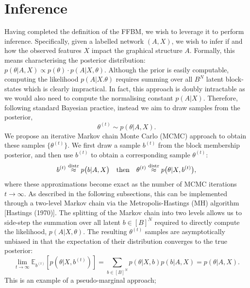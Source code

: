 \section{Inference}
\label{sec:inference}

Having completed the definition of the FFBM, we wish to leverage it 
to perform inference. Specifically, given a labelled network $(A, X)$, we wish to infer if and how the observed features $X$ impact the graphical structure $A$. Formally,
this means characterising the posterior distribution:
$
p(\theta|A, X) \propto p(\theta) \cdot p(A | X, \theta).
$
Although the prior is easily computable, 
computing the likelihood $p(A| X. \theta)$
requires summing over all $B^N$ latent block-states which is 
clearly impractical. In fact, this
approach is doubly intractable as we would also 
need to compute the normalising constant $p(A|X)$.
Therefore, following standard Bayesian practice,
instead we aim to draw samples from the posterior,
%
\begin{equation}
	\label{eqn:theta-target}
	\theta^{(t)} \sim p(\theta | A, X).
\end{equation}
%
We propose an iterative Markov chain Monte Carlo
(MCMC) approach to obtain these samples
$\{\theta^{(t)}\}$. We first draw a sample $b^{(t)}$ 
from the block membership posterior,
and then use $b^{(t)}$ to obtain a corresponding
sample $\theta^{(t)}$:
%
\begin{equation}
	b^{(t)} \stackrel{\rm distr}{\approx} p \big( b | A, X \big) 
	\quad \textrm{then} \quad
	\theta^{(t)} \stackrel{\rm distr}{\approx} 
	p\big(\theta | X, b^{(t)} \big),
\end{equation}
%
where these approximations become exact as
the number of MCMC iterations $t\to\infty$.
As described in the following subsections,
this can be implemented through a two-level
Markov chain via the Metropolis-Hastings (MH) 
algorithm [Hastings (1970)].
The splitting of the Markov chain into two levels allows us to side-step the summation over
all latent $b \in [B]^N$ required to directly compute the likelihood, $p(A| X, \theta)$.
The resulting $\theta^{(t)}$ samples are asymptotically
unbiased in that the expectation of 
their distribution converges to the true posterior:
%
\begin{equation}
\lim_{t\to\infty}
\mathbb{E}_{b^{(t)}} \left[p \left( \theta | X, b^{(t)} \right) \right] = \sum_{b \in [B]^N} p(\theta | X, b) p(b | A, X) = p(\theta | A, X).
\label{eqn:theta-unbiased}
\end{equation}
%
This is an example of a pseudo-marginal approach;
